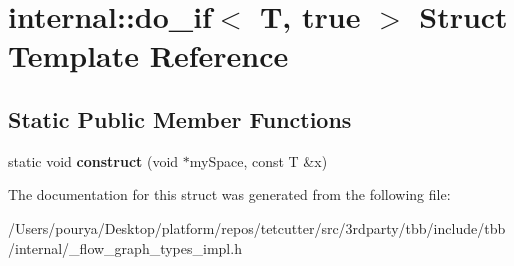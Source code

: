 \hypertarget{structinternal_1_1do__if_3_01T_00_01true_01_4}{}\section{internal\+:\+:do\+\_\+if$<$ T, true $>$ Struct Template Reference}
\label{structinternal_1_1do__if_3_01T_00_01true_01_4}
\subsection*{Static Public Member Functions}
\begin{DoxyCompactItemize}
\item 
\hypertarget{structinternal_1_1do__if_3_01T_00_01true_01_4_a09f5f806917fe9a14695b61a695e6420}{}static void {\bfseries construct} (void $\ast$my\+Space, const T \&x)\label{structinternal_1_1do__if_3_01T_00_01true_01_4_a09f5f806917fe9a14695b61a695e6420}

\end{DoxyCompactItemize}


The documentation for this struct was generated from the following file\+:\begin{DoxyCompactItemize}
\item 
/\+Users/pourya/\+Desktop/platform/repos/tetcutter/src/3rdparty/tbb/include/tbb/internal/\+\_\+flow\+\_\+graph\+\_\+types\+\_\+impl.\+h\end{DoxyCompactItemize}

